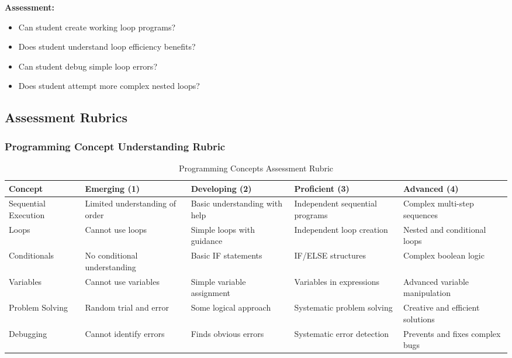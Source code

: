 \textbf{Assessment:}
\begin{itemize}
    \item Can student create working loop programs?
    \item Does student understand loop efficiency benefits?
    \item Can student debug simple loop errors?
    \item Does student attempt more complex nested loops?
\end{itemize}

\subsection{Assessment Rubrics}

\subsubsection{Programming Concept Understanding Rubric}

\begin{table}[H]
\centering
\caption{Programming Concepts Assessment Rubric}
\begin{tabular}{|p{3cm}|p{3cm}|p{3cm}|p{3cm}|p{3cm}|}
\hline
\textbf{Concept} & \textbf{Emerging (1)} & \textbf{Developing (2)} & \textbf{Proficient (3)} & \textbf{Advanced (4)} \\
\hline
Sequential Execution & Limited understanding of order & Basic understanding with help & Independent sequential programs & Complex multi-step sequences \\
\hline
Loops & Cannot use loops & Simple loops with guidance & Independent loop creation & Nested and conditional loops \\
\hline
Conditionals & No conditional understanding & Basic IF statements & IF/ELSE structures & Complex boolean logic \\
\hline
Variables & Cannot use variables & Simple variable assignment & Variables in expressions & Advanced variable manipulation \\
\hline
Problem Solving & Random trial and error & Some logical approach & Systematic problem solving & Creative and efficient solutions \\
\hline
Debugging & Cannot identify errors & Finds obvious errors & Systematic error detection & Prevents and fixes complex bugs \\
\hline
\end{tabular}
\label{tab:rubric}
\end{table}

